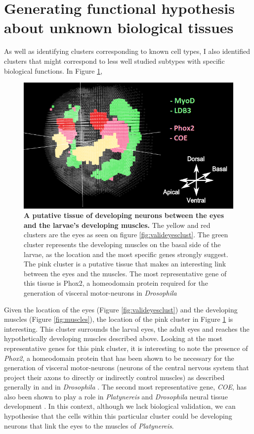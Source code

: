 	\section{Generating functional hypothesis about unknown biological tissues}
	As well as identifying clusters corresponding to known cell types, I also identified clusters that might correspond to less well studied subtypes with specific biological functions. In Figure \ref{fig:eyes_muscles}, 
	\begin{figure}[h]
\centerline{\includegraphics[width=0.8\linewidth]{gfx/chapter6/eyes_muscles.png}}
\caption{{\bf A putative tissue of developing neurons between the eyes and the larvae's developing muscles.} The yellow and red clusters are the eyes as seen on figure \ref{fig:valideyesclust}. The green cluster represents the developing muscles on the basal side of the larvae, as the location and the most specific genes strongly suggest. The pink cluster is a putative tissue that makes an interesting link between the eyes and the muscles. The most representative gene of this tissue is Phox2, a homeodomain protein required for the generation of visceral motor-neurons in \emph{Drosophila} \cite{briscoe99}}
\label{fig:eyes_muscles}
	\end{figure}

	Given the location of the eyes (Figure \ref{fig:valideyesclust}) and the developing muscles (Figure \ref{fig:muscles}), the location of the pink cluster in Figure \ref{fig:eyes_muscles} is interesting. This cluster surrounds the larval eyes, the adult eyes and reaches the hypothetically developing muscles described above. Looking at the most representative genes for this pink cluster, it is interesting to note the presence of {\it{Phox2}}, a homeodomain protein that has been shown to be necessary for the generation of visceral motor-neurons (neurons of the central nervous system that project their axons to directly or indirectly control muscles) as described generally in \cite{brunet02} and in \emph{Drosophila} \cite{briscoe99}. The second most representative gene, {\it{COE}}, has also been shown to play a role in \emph{Platynereis} and \emph{Drosophila} neural tissue development \cite{demilly11}. In this context, although we lack biological validation, we can hypothesise that the cells within this particular cluster could be developing neurons that link the eyes to the muscles of \emph{Platynereis}.\\
	
